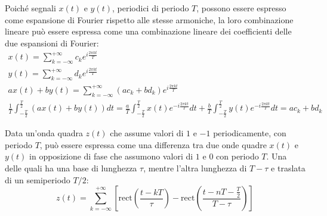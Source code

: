 \documentclass{article}
\numberwithin{equation}{subsection}
\begin{document}
Poiché segnali $x(t)$ e $y(t)$, periodici di periodo $T$, possono essere espresso come espansione di Fourier rispetto alle stesse armoniche, la loro combinazione lineare 
può essere espressa come una combinazione lineare dei coefficienti delle due espansioni di Fourier:
\begin{gather*}
    x(t)=\displaystyle\sum_{k=-\infty}^{+\infty}c_ke^{i\frac{2\pi  k t}{T}}\\    
    y(t)=\displaystyle\sum_{k=-\infty}^{+\infty}d_ke^{i\frac{2\pi  k t}{T}}\\
    ax(t)+by(t)=\displaystyle\sum_{k=-\infty}^{+\infty}(ac_k+bd_k)e^{i\frac{2\pi  k t}{T}}\\
    \displaystyle\frac{1}{T}\int_{-\frac{T}{2}}^{\frac{T}{2}}(ax(t)+by(t))dt=\frac{a}{T}\int_{-\frac{T}{2}}^{\frac{T}{2}}x(t)e^{-i\frac{2\pi  k t}{T}}dt
    +\frac{b}{T}\int_{-\frac{T}{2}}^{\frac{T}{2}}y(t)e^{-i\frac{2\pi  k t}{T}}dt=ac_k+bd_k
\end{gather*}

Data un'onda quadra $z(t)$ che assume valori di $1$ e $-1$ periodicamente, con periodo $T$, può essere espressa come una differenza tra due onde quadre $x(t)$ e $y(t)$ in 
opposizione di fase che assumono valori di $1$ e $0$ con periodo $T$. Una delle quali ha una base di lunghezza $\tau$, mentre l'altra lunghezza di $T-\tau$ e traslata di un 
semiperiodo $T/2$:
\begin{equation*}
    z(t)=\displaystyle\sum_{k=-\infty}^{+\infty}\left[\mbox{rect}\left(\frac{t-kT}{\tau}\right)-\mbox{rect}\left(\frac{t-nT-\frac{T}{2}}{T-\tau}\right)\right]
\end{equation*}

\begin{center}
\end{center}
\end{document}
